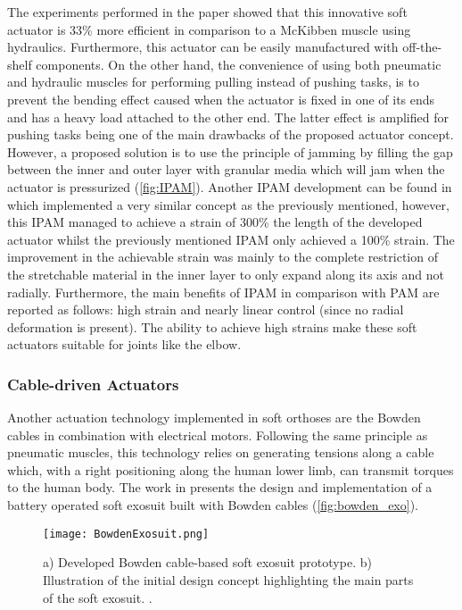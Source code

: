 The experiments performed in the paper showed that this innovative soft actuator is 33\% more efficient in comparison to a McKibben muscle using hydraulics. Furthermore, this actuator can be easily manufactured with off-the-shelf components. On the other hand, the convenience of using both pneumatic and hydraulic muscles for performing pulling instead of pushing tasks, is to prevent the bending effect caused when the actuator is fixed in one of its ends and has a heavy load attached to the other end. The latter effect is amplified for pushing tasks being one of the main drawbacks of the proposed actuator concept. However, a proposed solution is to use the principle of jamming by filling the gap between the inner and outer layer with granular media which will jam when the actuator is pressurized (\autoref{fig:IPAM}). Another IPAM development can be found in \cite{Hawkes2016} which implemented a very similar concept as the previously mentioned, however, this IPAM managed to achieve a strain of 300\% the length of the developed actuator whilst the previously mentioned IPAM only achieved a 100\% strain. The improvement in the achievable strain was mainly to the complete restriction of the stretchable material in the inner layer to only expand along its axis and not radially. Furthermore, the main benefits of IPAM in comparison with PAM are reported as follows: high strain and nearly linear control (since no radial deformation is present). The ability to achieve high strains make these soft actuators suitable for joints like the elbow.

\subsubsection{Cable-driven Actuators} \label{sec:cable-driven}

Another actuation technology implemented in soft orthoses are the Bowden cables in combination with electrical motors. Following the same principle as pneumatic muscles, this technology relies on generating tensions along a cable which, with a right positioning along the human lower limb, can transmit torques to the human body. The work in \cite{asbeck2013biologically} presents the design and implementation of a battery operated soft exosuit built with Bowden cables (\autoref{fig:bowden_exo}). 
\begin{figure}[hbtp!]
    \centering
    \texttt{[image: BowdenExosuit.png]}
    \caption{a) Developed Bowden cable-based soft exosuit prototype. b) Illustration of the initial design concept highlighting the main parts of the soft exosuit. \cite{asbeck2013biologically}. }
    \label{fig:bowden_exo}
\end{figure}

